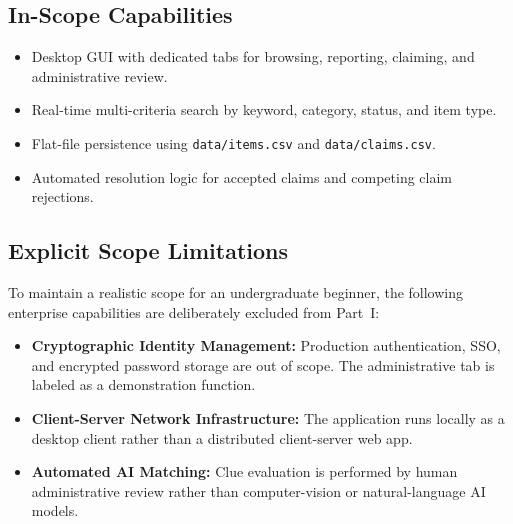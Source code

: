 \documentclass[11pt,a4paper]{article}
\begin{document}
\subsection{In-Scope Capabilities}
\begin{itemize}
    \item Desktop GUI with dedicated tabs for browsing, reporting, claiming, and administrative review.
    \item Real-time multi-criteria search by keyword, category, status, and item type.
    \item Flat-file persistence using \texttt{data/items.csv} and \texttt{data/claims.csv}.
    \item Automated resolution logic for accepted claims and competing claim rejections.
\end{itemize}

\subsection{Explicit Scope Limitations}
To maintain a realistic scope for an undergraduate beginner, the following enterprise capabilities are deliberately excluded from Part~I:
\begin{itemize}
    \item \textbf{Cryptographic Identity Management:} Production authentication, SSO, and encrypted password storage are out of scope. The administrative tab is labeled as a demonstration function.
    \item \textbf{Client-Server Network Infrastructure:} The application runs locally as a desktop client rather than a distributed client-server web app.
    \item \textbf{Automated AI Matching:} Clue evaluation is performed by human administrative review rather than computer-vision or natural-language AI models.
\end{itemize}

\end{document}
